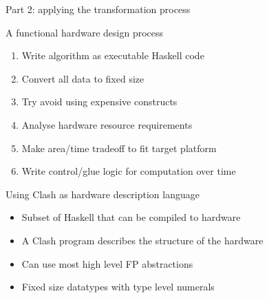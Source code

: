 \documentclass[pdf]{beamer}
\begin{document}
\begin{frame}{Part 2: applying the transformation process}

\begin{block}{A functional hardware design process}
\begin{enumerate}
\item Write algorithm as executable Haskell code
\item Convert all data to fixed size
\item Try avoid using expensive constructs %
\item Analyse hardware resource requirements
\item Make area/time tradeoff to fit target platform
\item Write control/glue logic for computation over time
\end{enumerate}
\end{block}

\begin{block}{Using Clash as hardware description language}
\begin{itemize}
\item Subset of Haskell that can be compiled to hardware
\item A Clash program describes the structure of the hardware
\item Can use most high level FP abstractions %
\item Fixed size datatypes with type level numerals
\end{itemize}
\end{block}

\end{frame}

\end{document}

